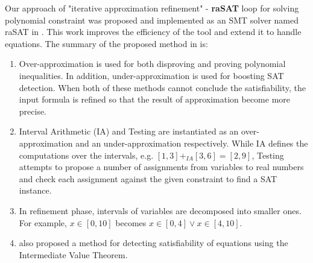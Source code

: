 Our approach of "iterative approximation refinement" - \textbf{raSAT} loop for solving polynomial constraint was proposed and implemented as an SMT solver named raSAT in \cite{VanKhanh201227}. This work improves the efficiency of the tool and extend it to handle equations. The summary of the proposed method in \cite{VanKhanh201227} is:
\begin{enumerate}
\item Over-approximation is used for both disproving and proving polynomial inequalities. In addition, under-approximation is used for boosting SAT detection. When both of these methods cannot conclude the satisfiability, the input formula is refined so that the result of approximation become more precise. 
\item Interval Arithmetic (IA) and Testing are instantiated as an over-approximation and an under-approximation respectively. While IA defines the computations over the intervals, e.g. $[1, 3] +_{IA} [3, 6] = [2, 9]$, Testing attempts to propose a number of assignments from variables to real numbers and check each assignment against the given constraint to find a SAT instance.
\item In refinement phase, intervals of variables are decomposed into smaller ones. For example, $x \in [0, 10]$ becomes $x \in [0, 4] \vee x \in [4, 10]$.
\item \citet{VanKhanh201227} also proposed a method for detecting satisfiability of equations using the Intermediate Value Theorem.
\end{enumerate}

